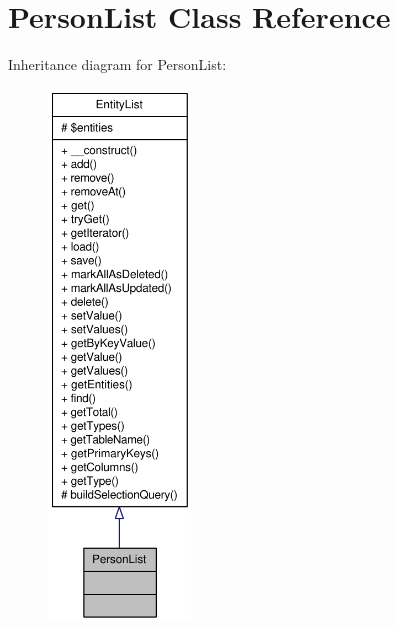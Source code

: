 \hypertarget{classPersonList}{
\section{PersonList Class Reference}
\label{classPersonList}
}


Inheritance diagram for PersonList:\nopagebreak
\begin{figure}[H]
\begin{center}
\leavevmode
\includegraphics[height=400pt]{classPersonList__inherit__graph}
\end{center}
\end{figure}


